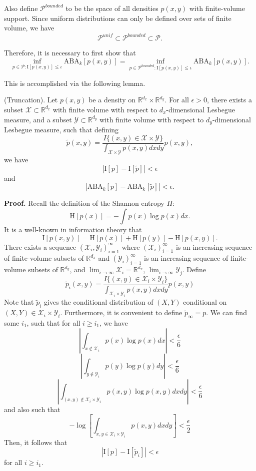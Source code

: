 Also define $\mathcal{P}^{bounded}$ to be the space of all densities $p(x, y)$ with finite-volume support.
Since uniform distributions can only be defined over sets of finite volume, we have
\[
\mathcal{P}^{unif} \subset \mathcal{P}^{bounded} \subset \mathcal{P}.
\]

Therefore, it is necessary to first show that
\[
\inf_{p \in \mathcal{P}: \text{I}[p(x,y)] \leq \iota} \text{ABA}_k[p(x,y)] = 
\inf_{p \in \mathcal{P}^{bounded}: \text{I}[p(x,y)] \leq \iota} \text{ABA}_k[p(x,y)].
\]

This is accomplished via the following lemma.

\begin{lemma}\label{lemma:truncation} (Truncation).
Let $p(x, y)$ be a density on
$\mathbb{R}^{d_x} \times \mathbb{R}^{d_y}$.  For all $\epsilon > 0$,
there exists a subset $\mathcal{X} \subset \mathbb{R}^{d_x}$ with
finite volume with respect to $d_x$-dimensional Lesbegue measure, and
a subset $\mathcal{Y} \subset \mathbb{R}^{d_y}$ with finite volume
with respect to $d_y$-dimensional Lesbegue measure, such that defining
\[
\tilde{p}(x, y) = \frac{I\{(x,y) \in \mathcal{X}\times \mathcal{Y}\} }{\int_{\mathcal{X} \times \mathcal{Y}} p(x,y) dx dy} p(x,y),
\]
we have
\[
|\text{I}[p] - \text{I}[\tilde{p}]| < \epsilon
\]
and
\[
|\text{ABA}_k[p] - \text{ABA}_k[\tilde{p}]| < \epsilon.
\]
\end{lemma}

\textbf{Proof.}
Recall the definition of the Shannon entropy $H$:
\[
\text{H}[p(x)] = - \int p(x) \log p(x) dx.
\]
It is a well-known in information theory that
\[
\text{I}[p(x, y)] = \text{H}[p(x)] + \text{H}[p(y)] - \text{H}[p(x, y)].
\]
There exists a sequence $(\mathcal{X}_i, \mathcal{Y}_i)_{i=1}^\infty$
where $(\mathcal{X}_i)_{i=1}^\infty$ is an increasing sequence of finite-volume subsets of $\mathbb{R}^{d_x}$
and $(\mathcal{Y}_i)_{i=1}^\infty$ is an increasing sequence of finite-volume subsets of $\mathbb{R}^{d_y}$,
and $\lim_{i \to \infty} \mathcal{X}_i = \mathbb{R}^{d_x}$, $\lim_{i \to \infty} \mathcal{Y}_j$.
Define
\[
\tilde{p}_i(x, y) = \frac{I\{(x,y) \in \mathcal{X}_i\times \mathcal{Y}_i\} }{\int_{\mathcal{X}_i \times \mathcal{Y}_i} p(x,y) dx dy} p(x,y)
\]
Note that $\tilde{p}_i$ gives the conditional distribution of $(X, Y)$
conditional on $(X, Y) \in \mathcal{X}_i \times \mathcal{Y}_i$. 
Furthermore, it is convenient to define $\tilde{p}_\infty = p$.
We can find some $i_1$, such that for all $i \geq i_1$, we have
\[
\left|\int_{x \notin \mathcal{X}_i} p(x) \log p(x) dx\right| < \frac{\epsilon}{6}
\]
\[
\left|\int_{y \notin \mathcal{Y}_i} p(y) \log p(y) dy\right| < \frac{\epsilon}{6}
\]
\[
\left|\int_{(x,y) \notin \mathcal{X}_i \times \mathcal{Y}_i} p(x, y) \log p(x, y) dx dy\right| < \frac{\epsilon}{6}
\]
and also such that
\[
-\log \left[\int_{x, y \in \mathcal{X}_i \times \mathcal{Y}_i} p(x, y) dx dy\right] < \frac{\epsilon}{2}
\]
Then, it follows that
\[
|\text{I}[p] - \text{I}[\tilde{p}_i]| < \epsilon
\]
for all $i \geq i_1$.

